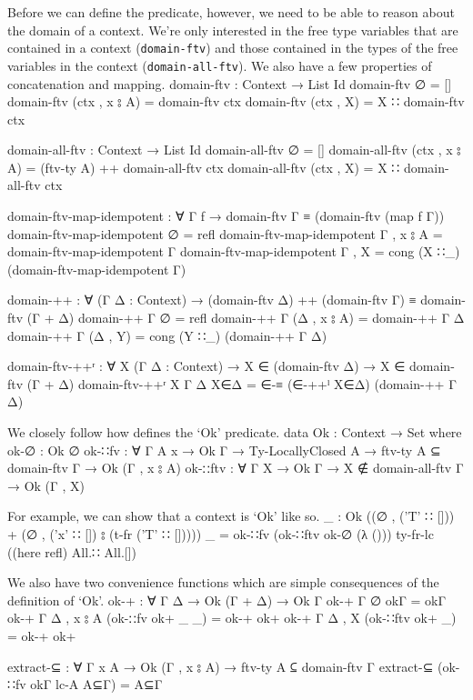 \documentclass[logo,bsc,singlespacing,parskip,online]{infthesis}
\renewenvironment{code}{\mintedcopy[breaklines,breaksymbolleft=\;]{agda}}{\endmintedcopy}
\begin{document}
Before we can define the predicate, however, we need to be able to reason about the domain of a
context. We're only interested in the free type variables that are contained in a context
(\texttt{domain-ftv}) and those contained in the types of the free variables in the context
(\texttt{domain-all-ftv}). We also have a few properties of concatenation and mapping.
\begin{code}
  domain-ftv : Context → List Id
  domain-ftv ∅ = []
  domain-ftv (ctx , x ⦂ A) = domain-ftv ctx
  domain-ftv (ctx , X) = X ∷ domain-ftv ctx

  domain-all-ftv : Context → List Id
  domain-all-ftv ∅ = []
  domain-all-ftv (ctx , x ⦂ A) = (ftv-ty A) ++ domain-all-ftv ctx
  domain-all-ftv (ctx , X) = X ∷ domain-all-ftv ctx

  domain-ftv-map-idempotent : ∀ {Γ f}
    → domain-ftv Γ ≡ (domain-ftv (map f Γ))
  domain-ftv-map-idempotent {∅} = refl
  domain-ftv-map-idempotent {Γ , x ⦂ A} =
    domain-ftv-map-idempotent {Γ}
  domain-ftv-map-idempotent {Γ , X} =
    cong (X ∷_) (domain-ftv-map-idempotent {Γ})

  domain-++ : ∀ (Γ Δ : Context)
    → (domain-ftv Δ) ++ (domain-ftv Γ) ≡ domain-ftv (Γ + Δ)
  domain-++ Γ ∅ = refl
  domain-++ Γ (Δ , x ⦂ A) = domain-++ Γ Δ
  domain-++ Γ (Δ , Y) = cong (Y ∷_) (domain-++ Γ Δ)

  domain-ftv-++ʳ : ∀ {X} (Γ Δ : Context)
    → X ∈ (domain-ftv Δ) → X ∈ domain-ftv (Γ + Δ)
  domain-ftv-++ʳ {X} Γ Δ X∈Δ = ∈-≡ (∈-++ˡ X∈Δ) (domain-++ Γ Δ)
\end{code}

We closely follow how \citet{chargueraud_locally_2012} defines the `Ok' predicate.
\begin{code}
  data Ok : Context → Set where
    ok-∅ : Ok ∅
    ok-∷fv : ∀ {Γ A x} → Ok Γ → Ty-LocallyClosed A
      → ftv-ty A ⊆ domain-ftv Γ → Ok (Γ , x ⦂ A)
    ok-∷ftv : ∀ {Γ X} → Ok Γ → X ∉ domain-all-ftv Γ → Ok (Γ , X)
\end{code}

For example, we can show that a context is `Ok' like so.
\begin{code}
  _ : Ok ((∅ , ('T' ∷ [])) + (∅ , ('x' ∷ []) ⦂ (t-fr ('T' ∷ []))))
  _ = ok-∷fv
    (ok-∷ftv ok-∅ (λ ())) ty-fr-lc ((here refl) All.∷ All.[])
\end{code}

We also have two convenience functions which are simple consequences of the definition of `Ok'.
\begin{code}
  ok-+ : ∀ {Γ Δ} → Ok (Γ + Δ) → Ok Γ
  ok-+ {Γ} {∅} okΓ = okΓ
  ok-+ {Γ} {Δ , x ⦂ A} (ok-∷fv ok+ _ _) = ok-+ ok+
  ok-+ {Γ} {Δ , X} (ok-∷ftv ok+ _) = ok-+ ok+

  extract-⊆ : ∀ {Γ x A} → Ok (Γ , x ⦂ A) → ftv-ty A ⊆ domain-ftv Γ
  extract-⊆ (ok-∷fv okΓ lc-A A⊆Γ) = A⊆Γ
\end{code}
\end{document}
